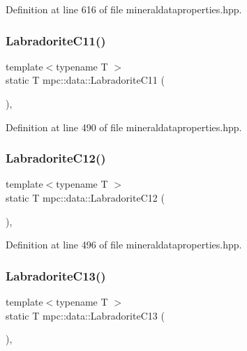 Definition at line 616 of file mineraldataproperties.\+hpp.

\mbox{\label{namespacempc_1_1data_a43b3d37ddf49a91a3dac3db51e98f098}} 
\subsubsection{\texorpdfstring{Labradorite\+C11()}{LabradoriteC11()}}
{\footnotesize\ttfamily template$<$typename T $>$ \\
static T mpc\+::data\+::\+Labradorite\+C11 (\begin{DoxyParamCaption}{ }\end{DoxyParamCaption})\hspace{0.3cm}{\ttfamily [inline]}, {\ttfamily [static]}}



Definition at line 490 of file mineraldataproperties.\+hpp.

\mbox{\label{namespacempc_1_1data_adf101e117504cfe59b7a705ac26e662b}} 
\subsubsection{\texorpdfstring{Labradorite\+C12()}{LabradoriteC12()}}
{\footnotesize\ttfamily template$<$typename T $>$ \\
static T mpc\+::data\+::\+Labradorite\+C12 (\begin{DoxyParamCaption}{ }\end{DoxyParamCaption})\hspace{0.3cm}{\ttfamily [inline]}, {\ttfamily [static]}}



Definition at line 496 of file mineraldataproperties.\+hpp.

\mbox{\label{namespacempc_1_1data_a35e490fa5bc1e66413cf4f6e76ef191e}} 
\subsubsection{\texorpdfstring{Labradorite\+C13()}{LabradoriteC13()}}
{\footnotesize\ttfamily template$<$typename T $>$ \\
static T mpc\+::data\+::\+Labradorite\+C13 (\begin{DoxyParamCaption}{ }\end{DoxyParamCaption})\hspace{0.3cm}{\ttfamily [inline]}, {\ttfamily [static]}}



